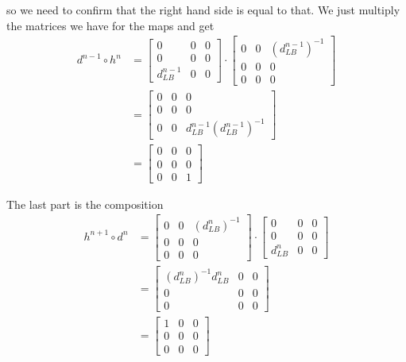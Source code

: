 so we need to confirm that the right hand side is equal to that. We just multiply the matrices we have for the maps and get 
\begin{align*}
    d^{n-1}\circ h^n 
    &= 
    \begin{bmatrix}
    0 & 0 & 0 \\
    0 & 0 & 0 \\
    d^{n-1}_{LB} & 0 & 0
    \end{bmatrix}
    \cdot
    \begin{bmatrix}
    0 & 0 & (d_{LB}^{n-1})^{-1}\\
    0 & 0 & 0\\
    0 & 0 & 0
    \end{bmatrix} \\
    &= 
    \begin{bmatrix}
    0 & 0 & 0 \\
    0 & 0 & 0 \\
    0 & 0 & d^{n-1}_{LB}(d_{LB}^{n-1})^{-1} 
    \end{bmatrix} \\
    &= 
    \begin{bmatrix}
    0 & 0 & 0 \\
    0 & 0 & 0 \\
    0 & 0 & 1 
    \end{bmatrix}
\end{align*}

The last part is the composition
\begin{align*}
    h^{n+1}\circ d^n 
    &=
    \begin{bmatrix}
    0 & 0 & (d_{LB}^{n})^{-1}\\
    0 & 0 & 0\\
    0 & 0 & 0
    \end{bmatrix}
    \cdot 
    \begin{bmatrix}
    0 & 0 & 0 \\
    0 & 0 & 0 \\
    d^{n}_{LB} & 0 & 0
    \end{bmatrix} \\
    &=
    \begin{bmatrix}
    (d_{LB}^{n})^{-1}d^{n}_{LB} & 0 & 0\\
    0 & 0 & 0\\
    0 & 0 & 0
    \end{bmatrix} \\
    &=
    \begin{bmatrix}
    1 & 0 & 0\\
    0 & 0 & 0\\
    0 & 0 & 0
    \end{bmatrix}
\end{align*}

